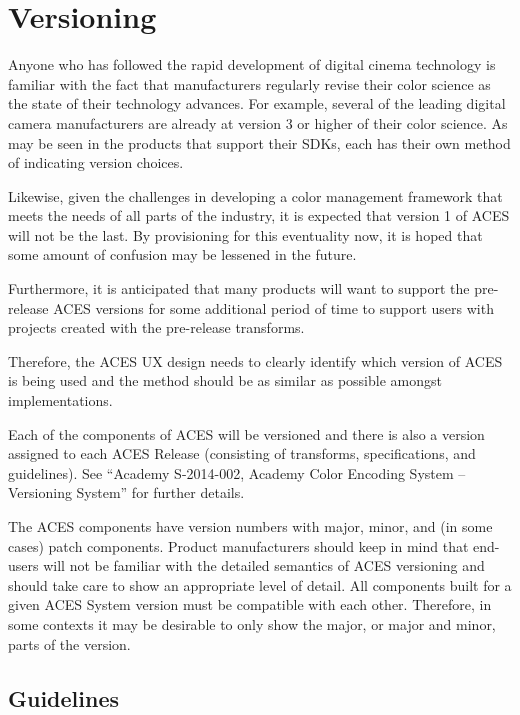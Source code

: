 \numberedformat
\chapter{Versioning}

Anyone who has followed the rapid development of digital cinema technology is familiar with the fact that manufacturers regularly revise their color science as the state of their technology advances. For example, several of the leading digital camera manufacturers are already at version 3 or higher of their color science. As may be seen in the products that support their SDKs, each has their own method of indicating version choices.

Likewise, given the challenges in developing a color management framework that meets the needs of all parts of the industry, it is expected that version 1 of ACES will not be the last. By provisioning for this eventuality now, it is hoped that some amount of confusion may be lessened in the future.

Furthermore, it is anticipated that many products will want to support the pre-release ACES versions for some additional period of time to support users with projects created with the pre-release transforms.

Therefore, the ACES UX design needs to clearly identify which version of ACES is being used and the method should be as similar as possible amongst implementations.

Each of the components of ACES will be versioned and there is also a version assigned to each ACES Release (consisting of transforms, specifications, and guidelines). See ``Academy S-2014-002, Academy Color Encoding System -- Versioning System'' for further details.

The ACES components have version numbers with major, minor, and (in some cases) patch components. Product manufacturers should keep in mind that end-users will not be familiar with the detailed semantics of ACES versioning and should take care to show an appropriate level of detail. All components built for a given ACES System version must be compatible with each other. Therefore, in some contexts it may be desirable to only show the major, or major and minor, parts of the version.

\section{Guidelines}
